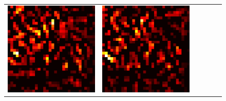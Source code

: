 \documentclass[preprint,12pt]{elsarticle}
\begin{document}
\begin{figure}[p]
\begin{tabular}{cccccc}
  \includegraphics[scale=\scale]{../visualizations/examples/cifar10/resnet18/active_saliency_map/7.png} & 
  \includegraphics[scale=\scale]{../visualizations/examples/cifar10/resnet18/inactive_saliency_map/7.png} \\
  

\end{tabular}
\end{figure}
\end{document}
